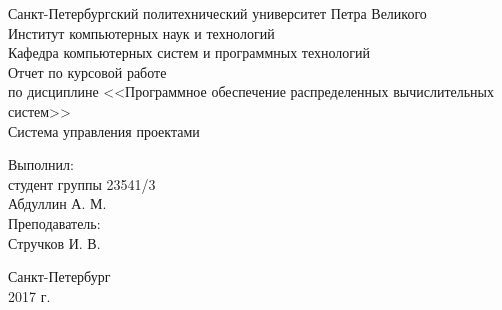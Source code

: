 	\begin{titlepage}
		\begin{center}
			Санкт-Петербургский политехнический	университет Петра Великого\\
			Институт компьютерных наук и технологий\\
			Кафедра компьютерных систем и программных технологий\\
			\vspace{6cm}
			Отчет по курсовой работе\\
			по дисциплине <<Программное обеспечение распределенных вычислительных систем>>\\
			\Large
			Система управления проектами\\
			\small
		\end{center}
		\vspace{3cm}
		\begin{flushright}
			Выполнил:\\
			студент группы 23541/3\\
			Абдуллин А. М.\\
			\vspace{1cm}			
			Преподаватель:\\
			Стручков И. В.\\
		\end{flushright}
		\vspace{4cm}
		\begin{center}
			Санкт-Петербург\\
			2017 г.\\
		\end{center}
	\end{titlepage}
	\newpage